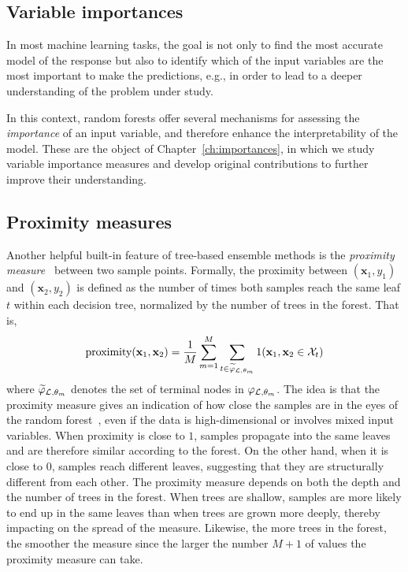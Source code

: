 \subsection{Variable importances}

In most machine learning tasks, the goal is not only to find the most accurate
model of the response but also to identify which of the input variables are the
most important to make the predictions, e.g., in order to lead to a deeper
understanding of the problem under study.

In this context, random forests offer several mechanisms for assessing the
\textit{importance} of an input variable, and therefore enhance the
interpretability of the model. These are the object of
Chapter~\ref{ch:importances}, in which we study variable importance measures
and develop original contributions to further improve their understanding.

\subsection{Proximity measures}

Another helpful built-in feature of tree-based ensemble methods is the
\textit{proximity measure}~\citep{breiman:2002} between two sample points. Formally, the proximity
between $(\mathbf{x}_1, y_1)$ and $(\mathbf{x}_2, y_2)$ is defined as the
number of times both samples reach the same leaf $t$ within each decision tree,
normalized by the number of trees in the forest. That is,
\begin{equation}
\text{proximity}(\mathbf{x}_1, \mathbf{x}_2) = \frac{1}{M} \sum_{m=1}^M \sum_{t \in \widetilde{\varphi}_{{\cal L},\theta_m}} 1(\mathbf{x}_1 , \mathbf{x}_2 \in {\cal X}_t)
\end{equation}
where $\widetilde{\varphi}_{{\cal L},\theta_m}$ denotes the set of terminal
nodes in $\varphi_{{\cal L},\theta_m}$. The idea is that the proximity measure
gives an indication of how close the  samples are in the eyes of the random
forest~\citep{hastie:2005}, even if the data is high-dimensional or involves
mixed input variables. When proximity is close to $1$, samples propagate into
the same leaves and are therefore similar according to the forest. On the other
hand, when it is close to $0$, samples reach different leaves, suggesting that
they are structurally different from each other. The proximity measure
depends on both the depth and the number of trees in the forest.
When trees are shallow, samples are more likely to end up in the same leaves
than when trees are grown more deeply, thereby impacting on the spread of the measure.
Likewise, the more trees in the forest, the smoother the measure since
the larger the number $M+1$ of values the proximity measure can take.

